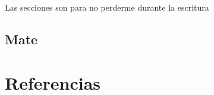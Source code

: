 \documentclass[12pt,letterpaper,draft]{article}
\begin{document}
%
\tableofcontents
\pagebreak
Las secciones son para no perderme durante la escritura

\subsection {Mate}


\section {Referencias}\label{sec:refs}
\printbibliography[heading=none]
\end{document}

